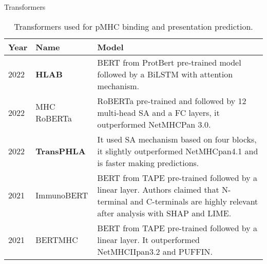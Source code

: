 \documentclass[10pt]{beamer}
\newcommand{\1}{
	\setbeamertemplate{background}{
		\texttt{[image: img/1]}
		\tikz[overlay] \fill[fill opacity=0.75,fill=white] (0,0) rectangle (-\paperwidth,\paperheight);
	}
}
\begin{document}
\begin{frame}{Transformers}{}
	
	
	 \begin{table}[]
	 	\caption{Transformers used for pMHC binding and presentation prediction.}
	 	\label{tab:transformes}
	 	\setlength{\tabcolsep}{0.5em} %
	 	{\renewcommand{\arraystretch}{1.1}%
	 		
	 		\begin{footnotesize}
	 			\begin{tabular}{p{0.8cm}p{1.5cm}p{7.3cm}}
	 				\multicolumn{1}{l}{\textbf{Year}}                                   & \textbf{Name}                       & \textbf{Model}     \\  \hline
	 				
	 				2022\cite{zhang2022hlab}&	\textbf{HLAB}&	BERT from ProtBert pre-trained model followed by a BiLSTM with attention mechanism.	\\
	 				
	 				2022\cite{wang2022mhcroberta}          & MHC RoBERTa             &  RoBERTa  pre-trained and followed by 12 multi-head SA and a FC layers, it outperformed NetMHCPan 3.0.                                                                                          \\
	 				2022\cite{chu2022transformer}          & \textbf{TransPHLA}                     & It used SA mechanism based on four blocks, it slightly outperformed NetMHCpan4.1 and is faster making predictions.\\
	 				
	 				2021\cite{gasser2021interpreting}  & ImmunoBERT                              & BERT from TAPE pre-trained followed by a linear layer. Authors claimed that N-terminal and C-terminals are highly relevant after analysis with SHAP and LIME.   \\
	 				
	 				2021\cite{cheng2021bertmhc}             & BERTMHC                            & BERT from TAPE pre-trained followed by a linear layer. It outperformed NetMHCIIpan3.2 and PUFFIN.   \\
	 			                  
	 			\end{tabular}
	 		\end{footnotesize}
	 	}
	 \end{table}
	 
	 
\end{frame}
\end{document}
